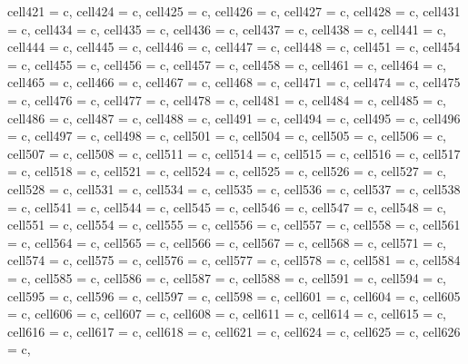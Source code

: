 {\begin{longtblr}[
  label = none,
  entry = none,
]
{  cell{42}{1} = {c},
  cell{42}{4} = {c},
  cell{42}{5} = {c},
  cell{42}{6} = {c},
  cell{42}{7} = {c},
  cell{42}{8} = {c},
  cell{43}{1} = {c},
  cell{43}{4} = {c},
  cell{43}{5} = {c},
  cell{43}{6} = {c},
  cell{43}{7} = {c},
  cell{43}{8} = {c},
  cell{44}{1} = {c},
  cell{44}{4} = {c},
  cell{44}{5} = {c},
  cell{44}{6} = {c},
  cell{44}{7} = {c},
  cell{44}{8} = {c},
  cell{45}{1} = {c},
  cell{45}{4} = {c},
  cell{45}{5} = {c},
  cell{45}{6} = {c},
  cell{45}{7} = {c},
  cell{45}{8} = {c},
  cell{46}{1} = {c},
  cell{46}{4} = {c},
  cell{46}{5} = {c},
  cell{46}{6} = {c},
  cell{46}{7} = {c},
  cell{46}{8} = {c},
  cell{47}{1} = {c},
  cell{47}{4} = {c},
  cell{47}{5} = {c},
  cell{47}{6} = {c},
  cell{47}{7} = {c},
  cell{47}{8} = {c},
  cell{48}{1} = {c},
  cell{48}{4} = {c},
  cell{48}{5} = {c},
  cell{48}{6} = {c},
  cell{48}{7} = {c},
  cell{48}{8} = {c},
  cell{49}{1} = {c},
  cell{49}{4} = {c},
  cell{49}{5} = {c},
  cell{49}{6} = {c},
  cell{49}{7} = {c},
  cell{49}{8} = {c},
  cell{50}{1} = {c},
  cell{50}{4} = {c},
  cell{50}{5} = {c},
  cell{50}{6} = {c},
  cell{50}{7} = {c},
  cell{50}{8} = {c},
  cell{51}{1} = {c},
  cell{51}{4} = {c},
  cell{51}{5} = {c},
  cell{51}{6} = {c},
  cell{51}{7} = {c},
  cell{51}{8} = {c},
  cell{52}{1} = {c},
  cell{52}{4} = {c},
  cell{52}{5} = {c},
  cell{52}{6} = {c},
  cell{52}{7} = {c},
  cell{52}{8} = {c},
  cell{53}{1} = {c},
  cell{53}{4} = {c},
  cell{53}{5} = {c},
  cell{53}{6} = {c},
  cell{53}{7} = {c},
  cell{53}{8} = {c},
  cell{54}{1} = {c},
  cell{54}{4} = {c},
  cell{54}{5} = {c},
  cell{54}{6} = {c},
  cell{54}{7} = {c},
  cell{54}{8} = {c},
  cell{55}{1} = {c},
  cell{55}{4} = {c},
  cell{55}{5} = {c},
  cell{55}{6} = {c},
  cell{55}{7} = {c},
  cell{55}{8} = {c},
  cell{56}{1} = {c},
  cell{56}{4} = {c},
  cell{56}{5} = {c},
  cell{56}{6} = {c},
  cell{56}{7} = {c},
  cell{56}{8} = {c},
  cell{57}{1} = {c},
  cell{57}{4} = {c},
  cell{57}{5} = {c},
  cell{57}{6} = {c},
  cell{57}{7} = {c},
  cell{57}{8} = {c},
  cell{58}{1} = {c},
  cell{58}{4} = {c},
  cell{58}{5} = {c},
  cell{58}{6} = {c},
  cell{58}{7} = {c},
  cell{58}{8} = {c},
  cell{59}{1} = {c},
  cell{59}{4} = {c},
  cell{59}{5} = {c},
  cell{59}{6} = {c},
  cell{59}{7} = {c},
  cell{59}{8} = {c},
  cell{60}{1} = {c},
  cell{60}{4} = {c},
  cell{60}{5} = {c},
  cell{60}{6} = {c},
  cell{60}{7} = {c},
  cell{60}{8} = {c},
  cell{61}{1} = {c},
  cell{61}{4} = {c},
  cell{61}{5} = {c},
  cell{61}{6} = {c},
  cell{61}{7} = {c},
  cell{61}{8} = {c},
  cell{62}{1} = {c},
  cell{62}{4} = {c},
  cell{62}{5} = {c},
  cell{62}{6} = {c},
}
\end{longtblr}}
